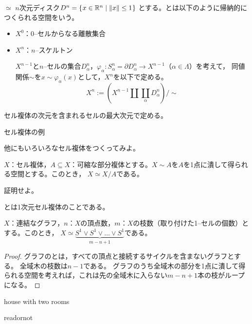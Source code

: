 \documentclass[uplatex]{jsarticle}
\begin{document}
\begin{teigi}
   $\simeq$ $n$次元ディスク$D^{n} = \Set{\hspace{-1.8pt} x \in \mathbb{R}^{n} | \left\| x \right\| \le 1 \hspace{-1.8pt}}$
  とする。とは以下のように帰納的につくられる空間をいう。
  \begin{itemize}
    \vspace{-0.5\baselineskip}
    \item $X^{0}$：0--セルからなる離散集合
    \item $X^{n}$：$n$--スケルトン
    
    $X^{n-1}$と$n$--セルの集合$D_{\alpha}^{n}$，$\varphi_{\alpha} \colon S_{\alpha}^{n} = \partial D_{\alpha}^{n} \longrightarrow X^{n-1}$（$\alpha \in \Lambda$）を考えて，
    同値関係$\sim$を$x \sim \varphi_{\alpha}(x)$として，$X^{n}$を以下で定める。
    \begin{equation}
      X^{n} := \left( X^{n - 1} \amalg \coprod_{\alpha} D_{\alpha}^{n} \right) / \sim
    \end{equation}
  \end{itemize}
  セル複体の次元を含まれるセルの最大次元で定める。
\end{teigi}

\begin{rei}
  セル複体の例
\end{rei}

 他にもいろいろなセル複体をつくってみよ。

\begin{hodai}
  $X$：セル複体，$A \subseteq X$：可縮な部分複体とする。$X \sim A$を$A$を1点に潰して得られる空間とする。このとき，
  $X \simeq X / A$である。
\end{hodai}

 証明せよ。

\begin{teigi}
  とは1次元セル複体のことである。
\end{teigi}

\begin{prop}
  $X$：連結なグラフ，$n$：$X$の頂点数，$m$：$X$の枝数（取り付けた1--セルの個数）とする。このとき，
  $X \simeq \underbrace{S^{1} \vee S^{1} \vee \dots \vee S^{1}}_{m-n+1}$である。
\end{prop}

\begin{proof}
  グラフのとは，すべての頂点と接続するサイクルを含まないグラフとする。
  全域木の枝数は$n-1$である。
  グラフのうち全域木の部分を1点に潰して得られる空間を考えれば，これは先の全域木に入らない$m-n+1$本の枝がループになる。
\end{proof}

 house with two rooms

\expandafter\ifx\csname readornot\endcsname\relax
  
\end{document}
